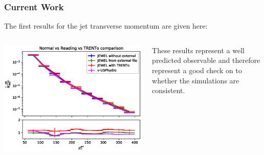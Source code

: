 \documentclass{beamer}
\begin{document}
\begin{frame}\frametitle{Current Work}
	\begin{minipage}{1\textwidth}
	The first results for the jet transverse momentum are given here:
    \end{minipage}
    \begin{columns}
    \begin{column}{0.5\textwidth}
	\begin{minipage}[l]{0.5\textwidth}
	\includegraphics[scale=0.4]{images/pt_cheking_consistency.eps}
	\end{minipage}
	\end{column}
    \begin{column}{0.4\textwidth}
	\begin{minipage}[r]{1\textwidth}
	These results represent a well predicted observable and therefore represent a good
	check on to whether the simulations are consistent.
	\end{minipage}
	\end{column}
	\end{columns}
\end{frame}
\end{document}
